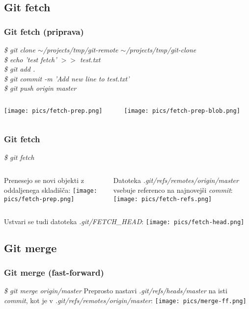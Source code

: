 \documentclass{beamer}
\begin{document}
\subsection{Git fetch}
\begin{frame}[shrink=20]
  \frametitle{Git fetch (priprava)}
  \emph{\$ git clone $\sim$/projects/tmp/git-remote $\sim$/projects/tmp/git-clone}\\
  \emph{\$ echo 'test fetch' $>>$ test.txt}\\
  \emph{\$ git add .}\\
  \emph{\$ git commit -m 'Add new line to test.txt'}\\
  \emph{\$ git push origin master}
  \newline
  \begin{columns}[c]
    \begin{column}{.5\textwidth}
      \texttt{[image: pics/fetch-prep.png]}
    \end{column}
    \begin{column}{.5\textwidth}
      \texttt{[image: pics/fetch-prep-blob.png]}
    \end{column}
  \end{columns}
\end{frame}

\begin{frame}
  \frametitle{Git fetch}
  \emph{\$ git fetch}
  \newline
  \begin{columns}[c]
    \begin{column}{.5\textwidth}
      Prenesejo se novi objekti z oddaljenega skladišča:
      \texttt{[image: pics/fetch-prep.png]}
    \end{column}
    \begin{column}{.5\textwidth}
      Datoteka \emph{.git/refs/remotes/origin/master} vsebuje referenco na
      najnovejši \emph{commit}:
      \texttt{[image: pics/fetch-refs.png]}
    \end{column}
  \end{columns}
  Ustvari se tudi datoteka \emph{.git/FETCH\_HEAD}:
  \texttt{[image: pics/fetch-head.png]}
\end{frame}

\subsection{Git merge}
\begin{frame}
  \frametitle{Git merge (fast-forward)}
  \emph{\$ git merge origin/master}
  \newline
  Preprosto nastavi \emph{.git/refs/heads/master} na isti \emph{commit}, kot je
  v \emph{.git/refs/remotes/origin/master}:
  \texttt{[image: pics/merge-ff.png]}
\end{frame}
\end{document}
